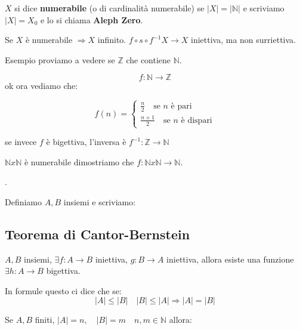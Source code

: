 \documentclass{article}
\theoremstyle{definition}
\begin{document}
$X$ si dice \textbf{numerabile} (o di cardinalità numerabile) se $|X| = |\mathbb{N}|$ e scriviamo $|X| = X_0$ e lo si chiama \textbf{Aleph Zero}. \par
Se $X$ è numerabile $\Rightarrow X$ infinito. \newline
$f \circ s \circ f^{-1} X \rightarrow X$ iniettiva, ma non surriettiva.

Esempio proviamo a vedere se $\mathbb{Z}$ che contiene $\mathbb{N}$. \par
\begin{equation}
        f : \mathbb{N} \rightarrow \mathbb{Z}
\end{equation}
ok ora vediamo che: \newline

\[
f(n) =
\begin{cases}
        \frac{n}{2} \quad \mbox{se $n$ è pari} \\
        \frac{n + 1}{2} \quad \mbox{se $n$ è dispari}
\end{cases}
\]

se invece $f$ è bigettiva, l'inversa è $f^{-1}: \mathbb{Z} \to \mathbb{N}$


$\mathbb{N} x \mathbb{N}$ è numerabile dimostriamo che $f: \mathbb{N} x \mathbb{N} \to \mathbb{N}$.

.

Definiamo $A,B$ insiemi e scriviamo: 



\subsection{Teorema di Cantor-Bernstein}
$A,B$ insiemi, $\exists f : A \to B$ iniettiva, $g: B \to A$ iniettiva, allora esiste una funzione $\exists h: A \to B$ bigettiva. \par
In formule questo ci dice che se:
\begin{equation}
        |A| \le |B| \quad |B| \le |A| \Rightarrow |A| = |B|
\end{equation} \newline

Se $A,B$ finiti, $|A| = n, \quad |B|= m \quad n,m \in \mathbb{N}$ allora: 
\end{document}
